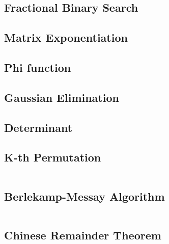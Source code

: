 \newpage

\subsection{Fractional Binary Search}
\subsection{Matrix Exponentiation}
\subsection{Phi function}
\subsection{Gaussian Elimination}
\subsection{Determinant}
\subsection{K-th Permutation}

\hrulefill \vspace{-\baselineskip}
\begin{multicols}{2}
\inputminted[autogobble,fontsize=\tiny]{C++}{Maths/kth_permutation.cpp}
\end{multicols}
\vspace{-\baselineskip}
\noindent \hrulefill

\subsection{Berlekamp-Messay Algorithm}

\hrulefill \vspace{-\baselineskip}
\begin{multicols}{2}
\inputminted[autogobble,fontsize=\tiny]{C++}{Maths/berlekampmessay.cpp}
\end{multicols}
\vspace{-\baselineskip}
\noindent \hrulefill

\newpage

\subsection{Chinese Remainder Theorem}

\hrulefill \vspace{-\baselineskip}
\begin{multicols}{2}
\inputminted[autogobble,fontsize=\tiny]{C++}{Maths/crt.cpp}
\end{multicols}
\vspace{-\baselineskip}
\noindent \hrulefill

